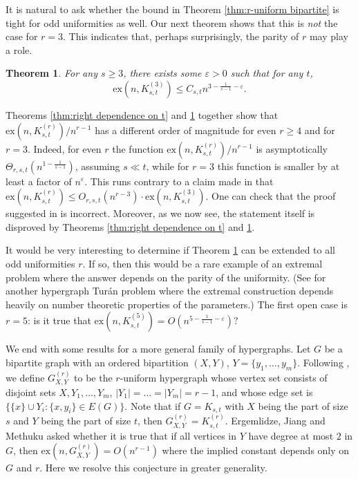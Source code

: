 \documentclass[a4paper,11pt]{article}
\newtheorem{theorem}{\bf Theorem}[section]
\theoremstyle{definition}
\def\eps{\varepsilon}
\def\ex{\mathrm{ex}}
\begin{document}
It is natural to ask whether the bound in Theorem \ref{thm:r-uniform bipartite} is tight for odd uniformities as well. Our next theorem shows that this is {\em not} the case for $r = 3$. This indicates that, perhaps surprisingly, the parity of $r$ may play a role. 

\begin{theorem} \label{thm:eps improvement}
     For any $s\geq 3$, there exists some $\eps>0$ such that for any $t$, $$\ex(n,K_{s,t}^{(3)})\leq C_{s,t} n^{3-\frac{1}{s-1}-\eps}.$$
\end{theorem}

Theorems \ref{thm:right dependence on t} and \ref{thm:eps improvement} together show that $\ex(n,K_{s,t}^{(r)})/n^{r-1}$ has a different order of magnitude for even $r \geq 4$ and for $r = 3$. Indeed,
for even $r$ the function $\ex(n,K_{s,t}^{(r)})/n^{r-1}$ is asymptotically $\Theta_{r,s,t}(n^{1 - \frac{1}{s-1}})$, assuming $s \ll t$, while for $r = 3$ this function is smaller by at least a factor of $n^{\varepsilon}$. 
This runs contrary to a claim made in \cite[Proposition 1]{EJM20} that $\ex(n,K_{s,t}^{(r)}) \leq O_{r,s,t}(n^{r-3}) \cdot \ex(n,K_{s,t}^{(3)})$. One can check that the proof suggested in \cite{EJM20} is incorrect. Moreover, as we now see, the statement itself is disproved by Theorems \ref{thm:right dependence on t} and \nolinebreak \ref{thm:eps improvement}.

It would be very interesting to determine if Theorem \ref{thm:eps improvement} can be extended to all odd uniformities $r$. If so, then this would be a rare example of an extremal problem where the answer depends on the parity of the uniformity. (See \cite{KS05} for another hypergraph Tur\'an problem where the extremal construction depends heavily on number theoretic properties of the parameters.) The first open case is $r = 5$: is it true that $\ex(n,K_{s,t}^{(5)})=O(n^{5-\frac{1}{s-1}-\eps})?$ 

We end with some results for a more general family of hypergraphs. Let $G$ be a bipartite graph with an ordered bipartition $(X,Y)$, $Y = \{y_1,\dots,y_m\}$. Following \cite{EJM20}, we define $G_{X,Y}^{(r)}$ to be the $r$-uniform hypergraph whose vertex set consists of disjoint sets $X,Y_1,\dots,Y_m$, $|Y_1| = \dots = |Y_m| = r-1$, and whose edge set is $\{\{x\} \cup Y_i : \{x,y_i\} \in E(G)\}$. Note that if $G=K_{s,t}$ with $X$ being the part of size $s$ and $Y$ being the part of size $t$, then $G_{X,Y}^{(r)}=K_{s,t}^{(r)}$.
Ergemlidze, Jiang and Methuku \cite{EJM20} asked whether it is true that if all vertices in $Y$ have degree at most $2$ in $G$, then $\ex(n,G_{X,Y}^{(r)}) = O(n^{r-1})$ where the implied constant depends only on $G$ and $r$. Here we resolve this conjecture in greater generality.
\end{document}
